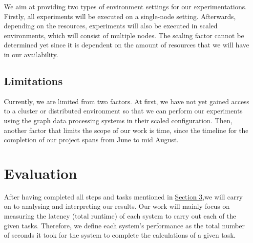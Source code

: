 \documentclass[a4paper,11pt]{article}
\begin{document}
\par We aim at providing two types of environment settings for our experimentations. Firstly, all experiments will be executed on a single-node setting. Afterwards, depending on the resources, experiments will also be executed in scaled environments, which will consist of multiple nodes. The scaling factor cannot be determined yet since it is dependent on the amount of resources that we will have in our availability.

\subsection{Limitations} \label{limitations}

Currently, we are limited from two factors. At first, we have not yet gained access to a cluster or distributed environment so that we can perform our experiments using the graph data processing systems in their scaled configuration. Then, another factor that limits the scope of our work is time, since the timeline for the completion of our project spans from June to mid August.


\section{Evaluation} \label{evaluation}

\par After having completed all steps and tasks mentioned in \hyperref[methodology]{Section 3},we will carry on to analysing and interpreting our results. Our work will mainly focus on measuring the latency (total runtime) of each system to carry out each of the given tasks. Therefore, we define each system's performance as the total number of seconds it took for the system to complete the calculations of a given task.
\end{document}
